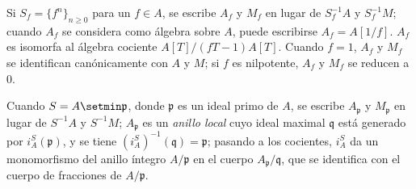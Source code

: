 \begin{env}[1.2.3]
\label{0.1.2.3-fr}
Si $S_f=\{f^n\}_{n\geq 0}$ para un $f\in A$, se escribe $A_f$ y $M_f$ en lugar de $S_f^{-1}A$ y $S_f^{-1}M$; cuando $A_f$ se considera como álgebra sobre $A$, puede escribirse $A_f=A[1/f]$.
$A_f$ es isomorfa al álgebra cociente $A[T]/(fT-1)A[T]$.
Cuando $f=1$, $A_f$ y $M_f$ se identifican canónicamente con $A$ y $M$; si $f$ es nilpotente, $A_f$ y $M_f$ se reducen a $0$.

Cuando $S=A\setmin\mathfrak{p}$, donde $\mathfrak{p}$ es un ideal primo de $A$, se escribe $A_{\mathfrak{p}}$ y $M_{\mathfrak{p}}$ en lugar de $S^{-1}A$ y $S^{-1}M$; $A_{\mathfrak{p}}$ es un \emph{anillo local} cuyo ideal maximal $\mathfrak{q}$ está generado por $i_A^S(\mathfrak{p})$, y se tiene $(i_A^S)^{-1}(\mathfrak{q})=\mathfrak{p}$; pasando a los cocientes, $i_A^S$ da un monomorfismo del anillo íntegro $A/\mathfrak{p}$ en el cuerpo $A_{\mathfrak{p}}/\mathfrak{q}$, que se identifica con el cuerpo de fracciones de $A/\mathfrak{p}$.
\end{env}
